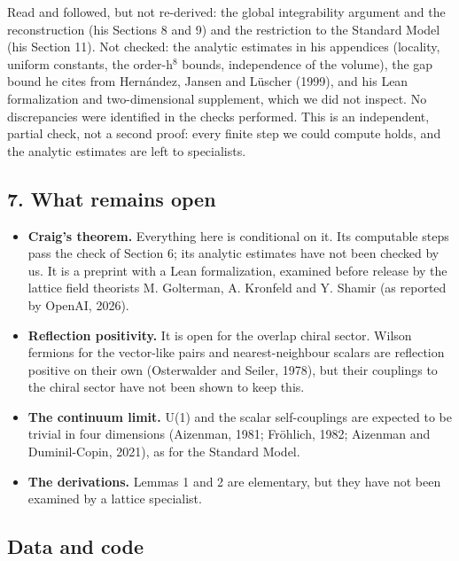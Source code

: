 \documentclass[
  11pt,
]{article}
\providecommand{\tightlist}{%
  \setlength{\itemsep}{0pt}\setlength{\parskip}{0pt}}
\begin{document}
Read and followed, but not re-derived: the global integrability argument and the reconstruction (his Sections 8 and 9) and the restriction to the Standard Model (his Section 11). Not checked: the analytic estimates in his appendices (locality, uniform constants, the order-h\ensuremath{^{8}} bounds, independence of the volume), the gap bound he cites from Hernández, Jansen and Lüscher (1999), and his Lean formalization and two-dimensional supplement, which we did not inspect. No discrepancies were identified in the checks performed. This is an independent, partial check, not a second proof: every finite step we could compute holds, and the analytic estimates are left to specialists.

\hypertarget{what-remains-open}{%
\subsection{7. What remains open}\label{what-remains-open}}

\begin{itemize}
\tightlist
\item
  \textbf{Craig's theorem.} Everything here is conditional on it. Its computable steps pass the check of Section 6; its analytic estimates have not been checked by us. It is a preprint with a Lean formalization, examined before release by the lattice field theorists M. Golterman, A. Kronfeld and Y. Shamir (as reported by OpenAI, 2026).
\item
  \textbf{Reflection positivity.} It is open for the overlap chiral sector. Wilson fermions for the vector-like pairs and nearest-neighbour scalars are reflection positive on their own (Osterwalder and Seiler, 1978), but their couplings to the chiral sector have not been shown to keep this.
\item
  \textbf{The continuum limit.} U(1) and the scalar self-couplings are expected to be trivial in four dimensions (Aizenman, 1981; Fröhlich, 1982; Aizenman and Duminil-Copin, 2021), as for the Standard Model.
\item
  \textbf{The derivations.} Lemmas 1 and 2 are elementary, but they have not been examined by a lattice specialist.
\end{itemize}

\hypertarget{data-and-code}{%
\subsection{Data and code}\label{data-and-code}}
\end{document}
